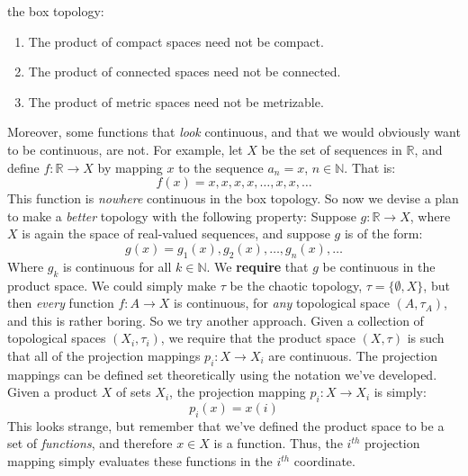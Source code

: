    the box topology:
    \begin{enumerate}
        \item The product of compact spaces need not be compact.
        \item The product of connected spaces need not be connected.
        \item The product of metric spaces need not be metrizable.
    \end{enumerate}
    Moreover, some functions that \textit{look} continuous, and that
    we would obviously want to be continuous, are not.
    For example, let $X$ be the set of sequences in $\mathbb{R}$,
    and define $f:\mathbb{R}\rightarrow{X}$ by mapping
    $x$ to the sequence $a_{n}=x$, $n\in\mathbb{N}$. That is:
    \begin{equation}
        f(x)=x,x,x,x,\dots,x,x,\dots
    \end{equation}
    This function is \textit{nowhere} continuous in the box topology.
    So now we devise a plan to make a \textit{better} topology
    with the following property:
    Suppose $g:\mathbb{R}\rightarrow{X}$,
    where $X$ is again the space of real-valued sequences, and
    suppose $g$ is of the form:
    \begin{equation}
        g(x)=g_{1}(x),g_{2}(x),\dots,g_{n}(x),\dots
    \end{equation}
    Where $g_{k}$ is continuous for all $k\in\mathbb{N}$. We
    \textbf{require} that $g$ be continuous in the product space.
    We could simply make $\tau$ be the chaotic topology,
    $\tau=\{\emptyset,X\}$, but then \textit{every} function
    $f:A\rightarrow{X}$ is continuous, for \textit{any}
    topological space $(A,\tau_{A})$, and this is rather boring.
    So we try another approach. Given a collection of topological
    spaces $(X_{i},\tau_{i})$, we require that the product space
    $(X,\tau)$ is such that all of the projection mappings
    $p_{i}:X\rightarrow{X}_{i}$ are continuous. The projection
    mappings can be defined set theoretically using the notation
    we've developed. Given a product $X$ of sets $X_{i}$,
    the projection mapping $p_{i}:X\rightarrow{X}_{i}$ is simply:
    \begin{equation}
        p_{i}(x)=x(i)
    \end{equation}
    This looks strange, but remember that
    we've defined the product space to be a set of
    \textit{functions}, and therefore $x\in{X}$ is a function.
    Thus, the $i^{th}$ projection mapping simply
    evaluates these functions in the $i^{th}$ coordinate.
